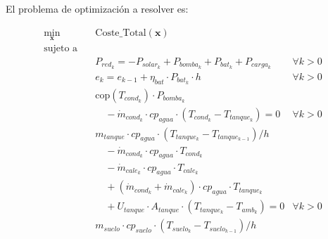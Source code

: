 El problema de optimización a resolver es:

\begin{align}
	\min_{\mathbf{x}} \quad & \text{Coste\_Total}(\mathbf{x})                                                                                                                \\
	\text{sujeto a} \quad   & \nonumber                                                                                                                                      \\
	                        & P_{red_k} = -P_{solar_k} + P_{bomba_k} + P_{bat_k} + P_{carga_k} \quad                                                         & \forall k > 0 \\
	                        & e_k = e_{k-1} + \eta_{bat} \cdot P_{bat_k} \cdot h \quad                                                                       & \forall k > 0 \\
	                        & \text{cop}(T_{cond_k}) \cdot P_{bomba_k} \nonumber                                                                                             \\
	                        & \quad - \dot{m}_{cond_k} \cdot cp_{agua} \cdot (T_{cond_k} - T_{tanque_k}) = 0 \label{eq:sys_1_sand}                           & \forall k > 0 \\
	                        & m_{tanque} \cdot cp_{agua} \cdot ( T_{tanque_k} - T_{tanque_{k-1}}) / h  \nonumber                                                             \\
	                        & \quad - \dot{m}_{cond_k} \cdot cp_{agua} \cdot T_{cond_k} \nonumber                                                                            \\
	                        & \quad - \dot{m}_{cale_k} \cdot cp_{agua} \cdot T_{cale_k} \nonumber                                                                            \\
	                        & \quad + (\dot{m}_{cond_k} + \dot{m}_{cale_k}) \cdot cp_{agua} \cdot T_{tanque_k} \nonumber                                                     \\
	                        & \quad + U_{tanque} \cdot A_{tanque} \cdot (T_{tanque_k} - T_{amb_k}) = 0 \label{eq:sys_2_sand}                                 & \forall k > 0 \\
	                        & m_{suelo} \cdot cp_{suelo} \cdot ( T_{suelo_k} - T_{suelo_{k-1}}) / h \nonumber                                                                \\

\end{align}
